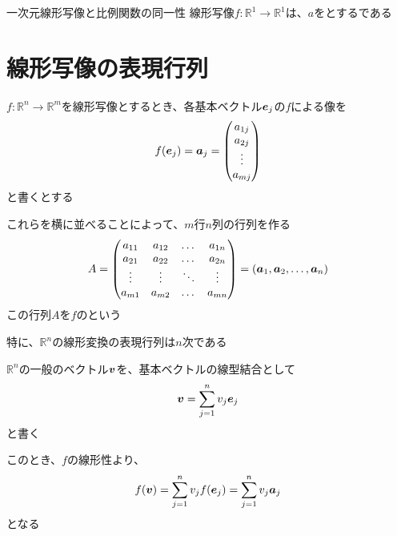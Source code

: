 \documentclass[../../../topic_linear-algebra]{subfiles}
\begin{document}
\begin{theorem}{一次元線形写像と比例関数の同一性}\label{thm:linear-map-R1-is-proportional}
  線形写像$f\colon \mathbb{R}^1 \to \mathbb{R}^1$は、$a$をとするである
\end{theorem}

\sectionline
\section{線形写像の表現行列}\label{sec:matrix-rep-of-linear-maps}

$f\colon \mathbb{R}^n \to \mathbb{R}^m$を線形写像とするとき、各基本ベクトル$\vb*{e}_j$の$f$による像を
\begin{equation*}
  f(\vb*{e}_j) = \vb*{a}_j = \begin{pmatrix}
    a_{1j} \\
    a_{2j} \\
    \vdots \\
    a_{mj}
  \end{pmatrix}
\end{equation*}
と書くとする

これらを横に並べることによって、$m$行$n$列の行列を作る
\begin{equation*}
  A = \begin{pmatrix}
    a_{11} & a_{12} & \dots  & a_{1n} \\
    a_{21} & a_{22} & \dots  & a_{2n} \\
    \vdots & \vdots & \ddots & \vdots \\
    a_{m1} & a_{m2} & \dots  & a_{mn}
  \end{pmatrix} = (\vb*{a}_1, \vb*{a}_2, \dots, \vb*{a}_n)
\end{equation*}
この行列$A$を$f$のという

\br

特に、$\mathbb{R}^n$の線形変換の表現行列は$n$次である

\sectionline

$\mathbb{R}^n$の一般のベクトル$\vb*{v}$を、基本ベクトルの線型結合として
\begin{equation*}
  \vb*{v} = \sum_{j=1}^n v_j \vb*{e}_j
\end{equation*}
と書く

このとき、$f$の線形性より、
\begin{equation*}
  f(\vb*{v}) = \sum_{j=1}^n v_j f(\vb*{e}_j) = \sum_{j=1}^n v_j \vb*{a}_j
\end{equation*}
となる
\end{document}

